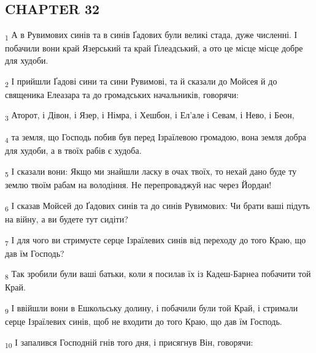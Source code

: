 \subsection{CHAPTER 32}
\begin{tcolorbox}
\textsubscript{1} А в Рувимових синів та в синів Ґадових були великі стада, дуже численні. І побачили вони край Язерський та край Ґілеадський, а ото це місце місце добре для худоби.
\end{tcolorbox}
\begin{tcolorbox}
\textsubscript{2} І прийшли Ґадові сини та сини Рувимові, та й сказали до Мойсея й до священика Елеазара та до громадських начальників, говорячи:
\end{tcolorbox}
\begin{tcolorbox}
\textsubscript{3} Аторот, і Дівон, і Язер, і Німра, і Хешбон, і Ел'але і Севам, і Нево, і Беон,
\end{tcolorbox}
\begin{tcolorbox}
\textsubscript{4} та земля, що Господь побив був перед Ізраїлевою громадою, вона земля добра для худоби, а в твоїх рабів є худоба.
\end{tcolorbox}
\begin{tcolorbox}
\textsubscript{5} І сказали вони: Якщо ми знайшли ласку в очах твоїх, то нехай дано буде ту землю твоїм рабам на володіння. Не перепроваджуй нас через Йордан!
\end{tcolorbox}
\begin{tcolorbox}
\textsubscript{6} І сказав Мойсей до Ґадових синів та до синів Рувимових: Чи брати ваші підуть на війну, а ви будете тут сидіти?
\end{tcolorbox}
\begin{tcolorbox}
\textsubscript{7} І для чого ви стримуєте серце Ізраїлевих синів від переходу до того Краю, що дав їм Господь?
\end{tcolorbox}
\begin{tcolorbox}
\textsubscript{8} Так зробили були ваші батьки, коли я посилав їх із Кадеш-Барнеа побачити той Край.
\end{tcolorbox}
\begin{tcolorbox}
\textsubscript{9} І ввійшли вони в Ешкольську долину, і побачили були той Край, і стримали серце Ізраїлевих синів, щоб не входити до того Краю, що дав їм Господь.
\end{tcolorbox}
\begin{tcolorbox}
\textsubscript{10} І запалився Господній гнів того дня, і присягнув Він, говорячи:
\end{tcolorbox}
